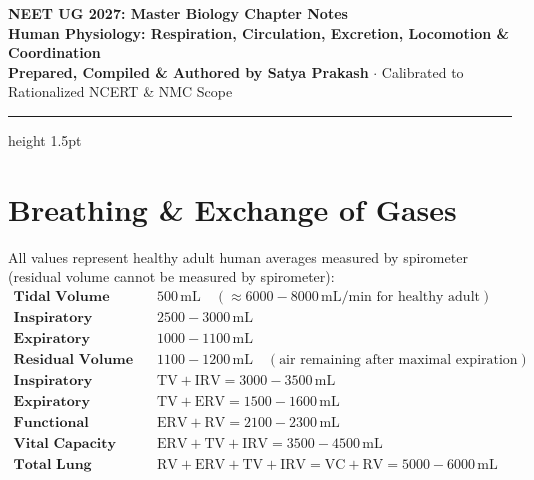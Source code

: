 \documentclass[10pt,a4paper]{article}
\begin{document}
\begin{center}
  {\Huge \textbf{NEET UG 2027: Master Biology Chapter Notes}}\\[6pt]
  {\Large \textbf{Human Physiology: Respiration, Circulation, Excretion, Locomotion \& Coordination}}\\[4pt]
  {\small \textbf{Prepared, Compiled \& Authored by Satya Prakash} $\cdot$ Calibrated to Rationalized NCERT \& NMC Scope}
  \vspace{4pt}
  \hrule height 1.5pt
\end{center}

\pagestyle{fancy}
\fancyhf{}
\fancyfoot[C]{\thepage}

\section{Breathing \& Exchange of Gases}

\begin{formulabox}
All values represent healthy adult human averages measured by spirometer (residual volume cannot be measured by spirometer):
\begin{align*}
  \textbf{Tidal Volume (TV): } & 500\,\mathrm{mL} \quad (\approx 6000-8000\,\mathrm{mL/min} \text{ for healthy adult})\\
  \textbf{Inspiratory Reserve Volume (IRV): } & 2500 - 3000\,\mathrm{mL}\\
  \textbf{Expiratory Reserve Volume (ERV): } & 1000 - 1100\,\mathrm{mL}\\
  \textbf{Residual Volume (RV): } & 1100 - 1200\,\mathrm{mL} \quad (\text{air remaining after maximal expiration})\\
  \textbf{Inspiratory Capacity (IC): } & \mathrm{TV} + \mathrm{IRV} = 3000 - 3500\,\mathrm{mL}\\
  \textbf{Expiratory Capacity (EC): } & \mathrm{TV} + \mathrm{ERV} = 1500 - 1600\,\mathrm{mL}\\
  \textbf{Functional Residual Capacity (FRC): } & \mathrm{ERV} + \mathrm{RV} = 2100 - 2300\,\mathrm{mL}\\
  \textbf{Vital Capacity (VC): } & \mathrm{ERV} + \mathrm{TV} + \mathrm{IRV} = 3500 - 4500\,\mathrm{mL}\\
  \textbf{Total Lung Capacity (TLC): } & \mathrm{RV} + \mathrm{ERV} + \mathrm{TV} + \mathrm{IRV} = \mathrm{VC} + \mathrm{RV} = 5000 - 6000\,\mathrm{mL}
\end{align*}
\end{formulabox}
\end{document}
